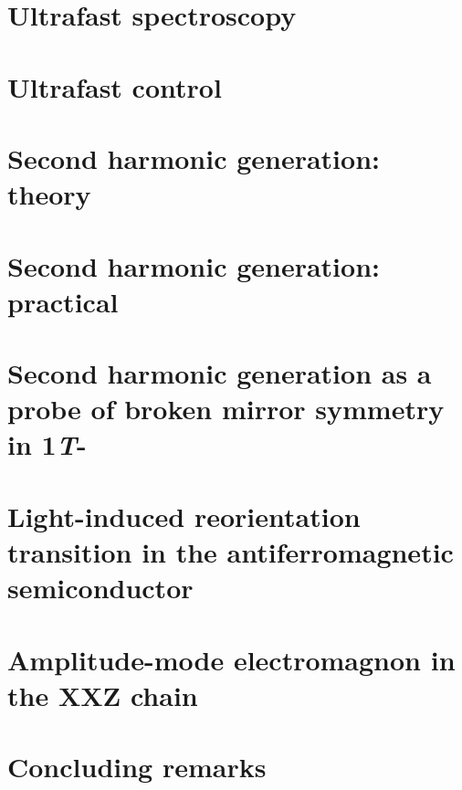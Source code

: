 \documentclass[
    letterpaper,
    12pt,
    openbib,
]{memoir}
\begin{document}
\frontmatter*


\acknowledgements

\clearpage

\tableofcontents
\clearpage
\listoffigures
\clearpage
\listoftables
\clearpage

\mainmatter*
\chapter{Ultrafast spectroscopy}
\chapter{Ultrafast control}
\chapter{Second harmonic generation: theory}
\chapter{Second harmonic generation: practical}
\chapter{Second harmonic generation as a probe of broken mirror symmetry in 1\textit{T}-}
\chapter{Light-induced reorientation transition in the antiferromagnetic semiconductor }
\chapter{Amplitude-mode electromagnon in the XXZ chain }
\chapter{Concluding remarks}

\backmatter
\begin{thebibliography}

\end{thebibliography}
\end{document}
